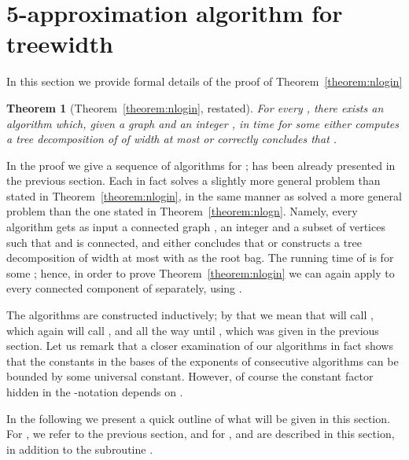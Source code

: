 \documentclass[a4paper,11pt]{article}
\newtheorem{theorem}{Theorem}
\theoremstyle{definition}
\theoremstyle{remark}
\begin{document}
\newcommand{\forg}{\texttt{forgotten}}

\section{ 5-approximation algorithm for
  treewidth}
\label{section:logi}

In this section we provide formal details of the proof of
Theorem~\ref{theorem:nlogin}
\begin{theorem}[Theorem~\ref{theorem:nlogin}, restated]
  For every , there exists an algorithm which,
  given a graph  and an integer , in  time for some  either computes
  a tree decomposition of  of width at most  or correctly
  concludes that .
\end{theorem}

In the proof we give a sequence of algorithms  for
;  has been already presented in the
previous section.  Each  in fact solves a slightly more
general problem than stated in Theorem~\ref{theorem:nlogin}, in the
same manner as  solved a more general problem than the one
stated in Theorem~\ref{theorem:nlogn}.  Namely, every algorithm
 gets as input a connected graph , an integer  and
a subset of vertices  such that  and  is connected, and either concludes that  or constructs
a tree decomposition of width at most  with  as the root
bag.  The running time of  is  for some ; hence, in order to
prove Theorem~\ref{theorem:nlogin} we can again apply 
to every connected component of  separately, using .

The algorithms  are constructed inductively; by that we
mean that  will call , which again will
call , and all the way until , which was
given in the previous section.  Let us remark that a closer
examination of our algorithms in fact shows that the constants  in
the bases of the exponents of consecutive algorithms can be bounded by
some universal constant.  However, of course the constant factor
hidden in the -notation depends on .

In the following we present a quick outline of what will be given in
this section.  For , we refer to the previous section, and
for ,  and  are described
in this section, in addition to the subroutine .
\end{document}
